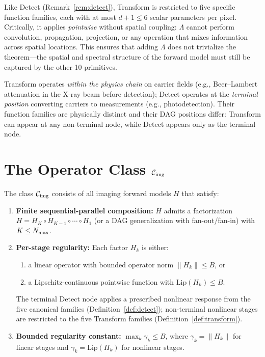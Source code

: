 \documentclass[11pt]{article}
\begin{document}
\begin{remark}
\label{rem:transform}
Like Detect (Remark~\ref{rem:detect}), Transform is restricted to five specific function families, each with at most $d + 1 \leq 6$ scalar parameters per pixel. Critically, it applies \emph{pointwise} without spatial coupling: $\Lambda$ cannot perform convolution, propagation, projection, or any operation that mixes information across spatial locations. This ensures that adding $\Lambda$ does not trivialize the theorem---the spatial and spectral structure of the forward model must still be captured by the other 10 primitives.
\end{remark}

\begin{remark}
\label{rem:transform_detect}
Transform operates \emph{within the physics chain} on carrier fields (e.g., Beer--Lambert attenuation in the X-ray beam before detection); Detect operates at the \emph{terminal position} converting carriers to measurements (e.g., photodetection). Their function families are physically distinct and their DAG positions differ: Transform can appear at any non-terminal node, while Detect appears only as the terminal node.
\end{remark}


\section{The Operator Class \texorpdfstring{$\mathcal{C}_{\mathrm{img}}$}{C\_img}}
\label{sec:ctier}

\begin{definition}
\label{def:ctier}
The class $\mathcal{C}_{\mathrm{img}}$ consists of all imaging forward models $H$ that satisfy:
\begin{enumerate}
  \item \textbf{Finite sequential-parallel composition:} $H$ admits a factorization $H = H_K \circ H_{K-1} \circ \cdots \circ H_1$ (or a DAG generalization with fan-out/fan-in) with $K \leq N_{\max}$.
  \item \textbf{Per-stage regularity:} Each factor $H_k$ is either:
    \begin{enumerate}
      \item[(a)] a linear operator with bounded operator norm $\|H_k\| \leq B$, or
      \item[(b)] a Lipschitz-continuous pointwise function with $\mathrm{Lip}(H_k) \leq B$.
    \end{enumerate}
    The terminal Detect node applies a prescribed nonlinear response from the five canonical families (Definition~\ref{def:detect}); non-terminal nonlinear stages are restricted to the five Transform families (Definition~\ref{def:transform}).
  \item \textbf{Bounded regularity constant:} $\max_k \gamma_k \leq B$, where $\gamma_k = \|H_k\|$ for linear stages and $\gamma_k = \mathrm{Lip}(H_k)$ for nonlinear stages.
\end{enumerate}
\end{definition}
\end{document}
